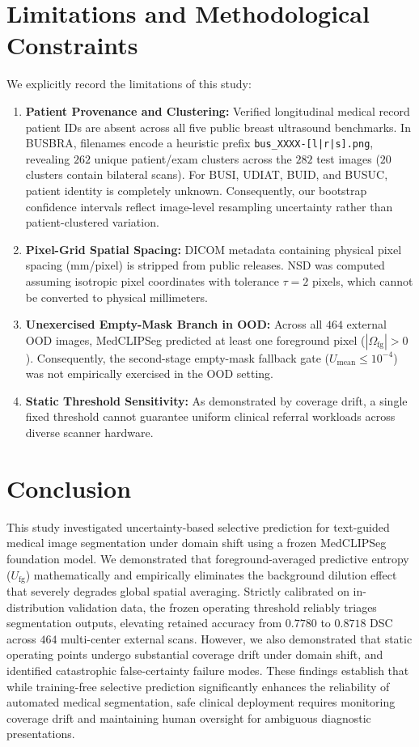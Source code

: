 \documentclass[10pt,journal,compsoc]{IEEEtran}
\begin{document}
\section{Limitations and Methodological Constraints}
We explicitly record the limitations of this study:
\begin{enumerate}
    \item \textbf{Patient Provenance and Clustering:} Verified longitudinal medical record patient IDs are absent across all five public breast ultrasound benchmarks. In BUSBRA, filenames encode a heuristic prefix \texttt{bus\_XXXX-[l|r|s].png}, revealing $262$ unique patient/exam clusters across the $282$ test images ($20$ clusters contain bilateral scans). For BUSI, UDIAT, BUID, and BUSUC, patient identity is completely unknown. Consequently, our bootstrap confidence intervals reflect image-level resampling uncertainty rather than patient-clustered variation.
    \item \textbf{Pixel-Grid Spatial Spacing:} DICOM metadata containing physical pixel spacing (mm/pixel) is stripped from public releases. NSD was computed assuming isotropic pixel coordinates with tolerance $\tau=2$ pixels, which cannot be converted to physical millimeters.
    \item \textbf{Unexercised Empty-Mask Branch in OOD:} Across all $464$ external OOD images, MedCLIPSeg predicted at least one foreground pixel ($|\Omega_{\mathrm{fg}}| > 0$). Consequently, the second-stage empty-mask fallback gate ($U_{\mathrm{mean}} \le 10^{-4}$) was not empirically exercised in the OOD setting.
    \item \textbf{Static Threshold Sensitivity:} As demonstrated by coverage drift, a single fixed threshold cannot guarantee uniform clinical referral workloads across diverse scanner hardware.
\end{enumerate}

\section{Conclusion}
This study investigated uncertainty-based selective prediction for text-guided medical image segmentation under domain shift using a frozen MedCLIPSeg foundation model. We demonstrated that foreground-averaged predictive entropy ($U_{\mathrm{fg}}$) mathematically and empirically eliminates the background dilution effect that severely degrades global spatial averaging. Strictly calibrated on in-distribution validation data, the frozen operating threshold reliably triages segmentation outputs, elevating retained accuracy from $0.7780$ to $0.8718$ DSC across $464$ multi-center external scans. However, we also demonstrated that static operating points undergo substantial coverage drift under domain shift, and identified catastrophic false-certainty failure modes. These findings establish that while training-free selective prediction significantly enhances the reliability of automated medical segmentation, safe clinical deployment requires monitoring coverage drift and maintaining human oversight for ambiguous diagnostic presentations.
\end{document}
